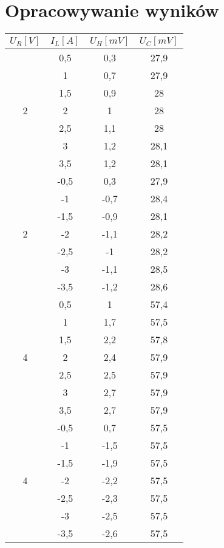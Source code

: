 \documentclass[11pt]{article}
\author{Łukasz Dubiel}
\begin{document}
\section{Opracowywanie wyników}

\begin{multicols}{2}

\begin{tabular}{|c|c|c|c|}
\hline
$U_R[V]$ & $I_L[A]$ & $U_H[mV]$ & $U_C[mV]$ \\
\hline
\multirow{7}{*}{2} & 0,5 & 0,3 & 27,9 \\
& 1   & 0,7 & 27,9 \\
& 1,5 & 0,9 & 28 \\
& 2   & 1 & 28 \\
& 2,5 & 1,1 & 28 \\
& 3   & 1,2 & 28,1 \\
& 3,5 & 1,2 & 28,1 \\
\hline
\multirow{7}{*}{2} & -0,5 & 0,3 & 27,9 \\
& -1   & -0,7 & 28,4 \\
& -1,5 & -0,9 & 28,1 \\
& -2   & -1,1 & 28,2 \\
& -2,5 & -1 & 28,2 \\
& -3   & -1,1 & 28,5 \\
& -3,5 & -1,2 & 28,6 \\
\hline

\multirow{7}{*}{4} & 0,5 & 1 & 57,4 \\
& 1   & 1,7 & 57,5 \\
& 1,5 & 2,2 & 57,8 \\
& 2   & 2,4 & 57,9 \\
& 2,5 & 2,5 & 57,9 \\
& 3   & 2,7 & 57,9 \\
& 3,5 & 2,7 & 57,9 \\
\hline
\multirow{7}{*}{4} & -0,5 & 0,7 & 57,5 \\
& -1   & -1,5 & 57,5 \\
& -1,5 & -1,9 & 57,5 \\
& -2   & -2,2 & 57,5 \\
& -2,5 & -2,3 & 57,5 \\
& -3   & -2,5 & 57,5 \\
& -3,5 & -2,6 & 57,5 \\
\hline


\end{tabular}
\end{multicols}
\end{document}
